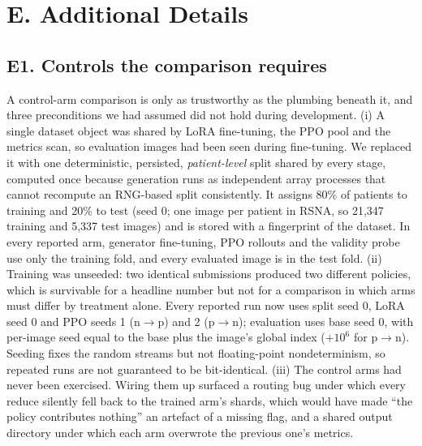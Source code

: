 
\section*{E. Additional Details}
\label{sec:suppl-details}
\setcounter{table}{0}
\renewcommand{\thetable}{E\arabic{table}}

\subsection*{E1. Controls the comparison requires}
\label{sec:suppl-controls}

A control-arm comparison is only as trustworthy as the plumbing beneath it, and three preconditions we had assumed did not hold during development. (i) A single dataset object was shared by LoRA fine-tuning, the PPO pool and the metrics scan, so evaluation images had been seen during fine-tuning. We replaced it with one deterministic, persisted, \emph{patient-level} split shared by every stage, computed once because generation runs as independent array processes that cannot recompute an RNG-based split consistently. It assigns 80\% of patients to training and 20\% to test (seed 0; one image per patient in RSNA, so 21{,}347 training and 5{,}337 test images) and is stored with a fingerprint of the dataset. In every reported arm, generator fine-tuning, PPO rollouts and the validity probe use only the training fold, and every evaluated image is in the test fold. (ii) Training was unseeded: two identical submissions produced two different policies, which is survivable for a headline number but not for a comparison in which arms must differ by treatment alone. Every reported run now uses split seed 0, LoRA seed 0 and PPO seeds 1 (n$\to$p) and 2 (p$\to$n); evaluation uses base seed 0, with per-image seed equal to the base plus the image's global index ($+10^6$ for p$\to$n). Seeding fixes the random streams but not floating-point nondeterminism, so repeated runs are not guaranteed to be bit-identical. (iii) The control arms had never been exercised. Wiring them up surfaced a routing bug under which every reduce silently fell back to the trained arm's shards, which would have made ``the policy contributes nothing'' an artefact of a missing flag, and a shared output directory under which each arm overwrote the previous one's metrics.

